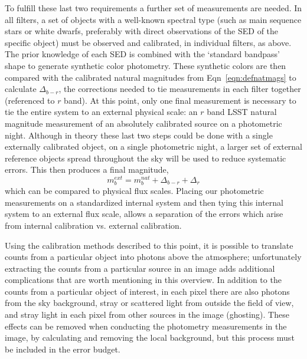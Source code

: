 \documentclass[12pt,preprint]{aastex}
\begin{document}
To fulfill these last two requirements a further set of measurements
are needed. In all filters, a set of objects with a well-known
spectral type (such as main sequence stars or white dwarfs, preferably
with direct observations of the SED of the specific object) must be
observed and calibrated, in individual filters, as above. The prior
knowledge of each SED is combined with the `standard bandpass' shape
to generate synthetic color photometry. These synthetic colors are
then compared with the calibrated natural magnitudes from
Eqn~\ref{eqn:defnatmags} to calculate $\Delta_{b-r}$, the corrections
needed to tie measurements in each filter together (referenced to $r$
band).  At this point, only one final measurement is necessary to tie
the entire system to an external physical scale: an $r$ band LSST
natural magnitude measurement of an absolutely calibrated source on a
photometric night. Although in theory these last two steps could be
done with a single externally calibrated object, on a single
photometric night, a larger set of external reference objects spread
throughout the sky will be used to reduce systematic errors. This then
produces a final magnitude, 
\begin{equation}
\label{eqn:finalmags}
m_b^{ext} = m_b^{nat}  + \Delta_{b-r} + \Delta_r
\end{equation}
which can be compared to physical flux scales. Placing our photometric
measurements on a standardized internal system and then tying this
internal system to an external flux scale, allows a separation
of the errors which arise from internal calibration vs. external
calibration. 

Using the calibration methods described to this point, it is possible
to translate counts from a particular object into photons above the
atmosphere; unfortunately extracting the counts from a particular
source in an image adds additional complications that are worth
mentioning in this overview. In addition to the counts from a
particular object of interest, in each pixel there are also photons
from the sky background, stray or scattered light from outside the
field of view, and stray light in each pixel from other sources
in the image (ghosting). These effects can be removed when conducting
the photometry measurements in the image, by calculating and removing
the local background, but this process must be included in the error
budget.
\end{document}
